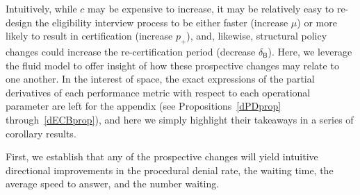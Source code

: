\documentclass[manuscript,screen,authorversion]{acmart}
\begin{document}
Intuitively, while $c$ may be expensive to increase, it may be relatively easy to re-design the eligibility interview process to be either faster (increase $\mu$) or more likely to result in certification (increase $p_+$), and, likewise, structural policy changes could increase the re-certification period (decrease $\delta_\mathsf{B}$). Here, we leverage the fluid model to offer insight of how these prospective changes may relate to one another.
In the interest of space, the exact expressions of the partial derivatives of each performance metric with respect to each operational parameter are left for the appendix (see Propositions~\ref{dPDprop} through~\ref{dECBprop}), and here we simply highlight their takeaways in a series of corollary results. %

First, we establish that any of the prospective changes will yield intuitive directional improvements in the procedural denial rate, the waiting time, the average speed to answer, and the number waiting. 






\end{document}
